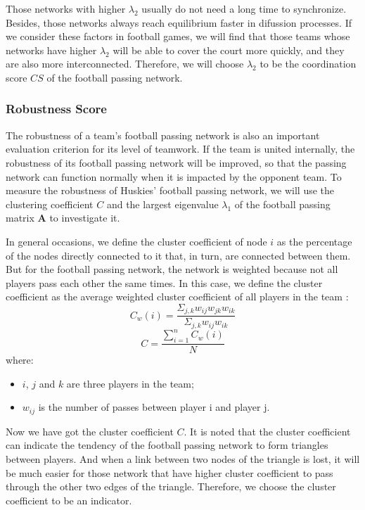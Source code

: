 \documentclass{mcmthesis}
\begin{document}
	Those networks with higher  $\lambda_{2}$ usually do not need a long time to synchronize. Besides, those networks always reach equilibrium faster in difussion processes.  If we consider these factors in football games, we will find that those teams whose networks have higher $\lambda_{2}$ will be able to cover the court more quickly, and they are also more interconnected.  Therefore, we will choose $\lambda_{2}$ to be the coordination score $CS$ of the football passing network.
\subsubsection{Robustness Score}
	The robustness of a team's football passing network is also an important evaluation criterion for its level of teamwork.  If the team is united internally, the robustness of its football passing network will be improved, so that the passing network can function normally when it is impacted by the opponent team.  To measure the robustness of Huskies' football passing network, we will use the clustering coefficient $C$ and the largest eigenvalue $\lambda_{1}$ of the football passing matrix $\textbf{A}$ to investigate it.  

	In general occasions, we define the cluster coefficient of node $i$ as the percentage of the nodes directly connected to it that, in turn, are connected between them.  But for the football passing network, the network is weighted because not all players pass each other the same times.  In this case, we define the cluster coefficient as the average weighted cluster coefficient of all players in the team :
	\begin{equation}\label{eq:cwi}
		C_{w}(i) = \frac{\Sigma_{j,k}w_{ij}w_{jk}w_{ik}}{\Sigma_{j,k}w_{ij}w_{ik}}
	\end{equation}
	\begin{equation}\label{eq:c}
		C = \frac{\sum_{i=1}^n C_{w}(i)}{N}
	\end{equation}
	where:
	\begin{itemize}
	\item $i$, $j$ and $k$ are three players in the team;
	\item 	$w_{ij}$ is the number of passes between player i and player j.
	\end{itemize}	
	
	Now we have got the cluster coefficient $C$. It is noted that the cluster coefficient can indicate the tendency of the football passing network to form triangles between players.  And when a link between two nodes of the triangle is lost, it will be much easier for those network that have higher cluster coefficient to pass through the other two edges of the triangle.  Therefore, we choose the cluster coefficient to be an indicator.
\end{document}
